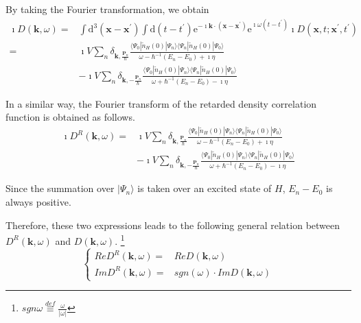 By taking the Fourier transformation, we obtain
\begin{equation} \label{Eqs3.1.16} \begin{split}
\imath D(\mathbf{k},\omega) =& \int \mathrm{d}^3 (\mathbf{x}-\mathbf{x}^{'}) \int \mathrm{d} (t-t^{'}) \mathrm{e}^{-\imath \mathbf{k} \cdot (\mathbf{x}-\mathbf{x}^{'})}\mathrm{e}^{\imath \omega (t-t^{'})} \imath D(\mathbf{x},t;\mathbf{x}^{'},t^{'})\\
=& \imath V \sum_n \delta_{\mathbf{k},\frac{\mathbf{P}_n}{\hbar}}\frac{\langle \Psi_0 | \tilde{n}_H(0) | \Psi_n \rangle \langle \Psi_n | \tilde{n}_H(0) | \Psi_0 \rangle}{ \omega - \hbar^{-1}(E_n-E_0) + \imath \eta}\\
& -\imath V \sum_n \delta_{\mathbf{k},-\frac{\mathbf{P}_n}{\hbar}}\frac{\langle \Psi_0 | \tilde{n}_H(0) | \Psi_n \rangle \langle \Psi_n | \tilde{n}_H(0) | \Psi_0 \rangle}{ \omega + \hbar^{-1}(E_n-E_0) - \imath \eta}
\end{split} \end{equation}

In a similar way, the Fourier transform of the retarded density correlation function is obtained as follows.
\begin{equation} \label{Eqs3.1.17} \begin{split}
\imath D^R(\mathbf{k},\omega) =& \imath V \sum_n \delta_{\mathbf{k},\frac{\mathbf{P}_n}{\hbar}}\frac{\langle \Psi_0 | \tilde{n}_H(0) | \Psi_n \rangle \langle \Psi_n | \tilde{n}_H(0) | \Psi_0 \rangle}{ \omega - \hbar^{-1}(E_n-E_0) + \imath \eta}\\
& -\imath V \sum_n \delta_{\mathbf{k},-\frac{\mathbf{P}_n}{\hbar}}\frac{\langle \Psi_0 | \tilde{n}_H(0) | \Psi_n \rangle \langle \Psi_n | \tilde{n}_H(0) | \Psi_0 \rangle}{ \omega + \hbar^{-1}(E_n-E_0) - \imath \eta}
\end{split}\end{equation}

Since the summation over $|\Psi_n\rangle$ is taken over an excited state of $H$, $E_n-E_0$ is always positive.

Therefore, these two expressions leads to the following general relation between $D^R(\mathbf{k},\omega)$ and $D(\mathbf{k},\omega)$.
\footnote{$sgn \omega \overset{def}{\equiv} \frac{\omega}{|\omega|}$}
\begin{equation} \label{Eqs3.1.18} \left\{ \begin{split}
Re D^R(\mathbf{k},\omega) =& Re D(\mathbf{k},\omega)\\
Im D^R(\mathbf{k},\omega) =& sgn(\omega) \cdot Im D(\mathbf{k},\omega)
\end{split}\right.\end{equation}

